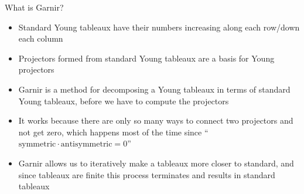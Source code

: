 \documentclass{beamer}
\begin{document}
    \begin{frame}{What is Garnir?}
        \begin{itemize}
            \item Standard Young tableaux have their numbers increasing along each row/down each column
            \item Projectors formed from standard Young tableaux are a basis for Young projectors
            \item Garnir is a method for decomposing a Young tableaux in terms of standard Young tableaux, before we have to compute the projectors
            \item It works because there are only so many ways to connect two projectors and not get zero, which happens most of the time since \enquote{\(\text{symmetric} \cdot \text{antisymmetric} = 0\)}
            \item Garnir allows us to iteratively make a tableaux more closer to standard, and since tableaux are finite this process terminates and results in standard tableaux
        \end{itemize}
    \end{frame}
    
\end{document}
